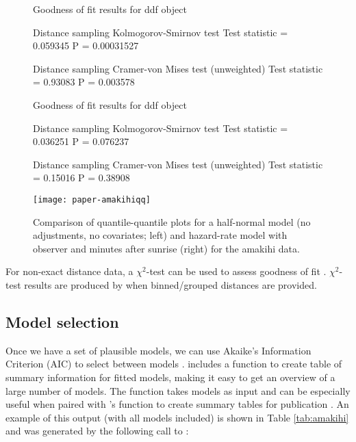 \documentclass[article]{jss}
\begin{document}
\begin{figure}
\begin{center}
\begin{Schunk}
\begin{Soutput}
Goodness of fit results for ddf object

Distance sampling Kolmogorov-Smirnov test
Test statistic =  0.059345  P =  0.00031527 

Distance sampling Cramer-von Mises test (unweighted)
Test statistic =  0.93083  P =  0.003578 
\end{Soutput}
\begin{Soutput}
Goodness of fit results for ddf object

Distance sampling Kolmogorov-Smirnov test
Test statistic =  0.036251  P =  0.076237 

Distance sampling Cramer-von Mises test (unweighted)
Test statistic =  0.15016  P =  0.38908 
\end{Soutput}
\end{Schunk}
\texttt{[image: paper-amakihiqq]}
\caption{Comparison of quantile-quantile plots for a half-normal model (no adjustments, no covariates; left) and hazard-rate model with observer and minutes after sunrise (right) for the amakihi data.}
\label{amakihi-qq}
\end{center}
\end{figure}

For non-exact distance data, a $\chi^2$-test can be used to assess goodness of fit \citep[see][Section 3.4.4]{Buckland:2001vm}. $\chi^2$-test results are produced by  when binned/grouped distances are provided.

\subsection{Model selection}

Once we have a set of plausible models, we can use Akaike's Information Criterion (AIC) to select between models \citep[see e.g.][]{burnham2003model}.  includes a function to create table of summary information for fitted models, making it easy to get an overview of a large number of models. The  function takes models as input and can be especially useful when paired with 's  function to create summary tables for publication \citep{knitr-pkg}. An example of this output (with all models included) is shown in Table \ref{tab:amakihi} and was generated by the following call to :
\end{document}
